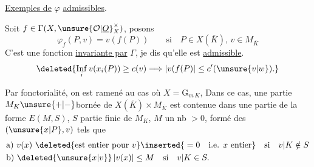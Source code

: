 \uline{Exemples de} $\varphi$ \uline{admissibles}.

Soit $f\in\Gamma(X,\unsure{\mathcal O|\underline O}_X^{\times})$, posons
\[
\varphi_f(P,v)=v(f(P))\qquad\text{si}\quad P\in X(\overline K),\,v\in M_{\overline K}
\]
C'est une fonction \uline{invariante par} $\Gamma$, je dis qu'elle est \uline{admissible}. 
\[
\deleted{\mathop{\mathrm{Inf}}\limits_i v(x_i(P))\geq c(v)\Longrightarrow |v(f(P)|\leq c'(\unsure{v|w}).}
\]

Par fonctorialité, on est ramené au cas où $X=\mathrm G_{m\,K}$,    Dans ce cas,  une partie $M_K\unsure{+|-}$bornée de $X(\overline K)\times M_{\overline K}$  est contenue dans une partie de la forme $E(M,S)$, $S$ partie finie de $M_K$,  $M$ un nb $>0$, formé des $(\unsure{x|P},v)$ tels que
\[
\begin{aligned}
&\text{a) }v(x)\ \deleted{\text{est entier pour }v}\inserted{{}=0\quad\text{i.e. }x\text{ entier}}\quad\text{si}\quad v|K\notin S\\
&\text{b) }\deleted{\unsure{x|v}}\,|v(x)|\leq M\quad\text{si}\quad v|K\in S.
\end{aligned}
\]
